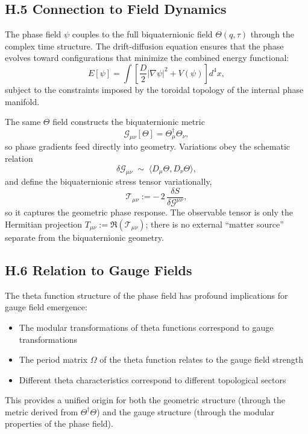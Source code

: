 \subsection*{H.5 Connection to Field Dynamics}

The phase field $\psi$ couples to the full biquaternionic field $\Theta(q,\tau)$ through the complex time structure. The drift-diffusion equation ensures that the phase evolves toward configurations that minimize the combined energy functional:
\begin{equation}
E[\psi] = \int \left[\frac{D}{2}|\nabla \psi|^2 + V(\psi)\right] d^4x,
\end{equation}
subject to the constraints imposed by the toroidal topology of the internal phase manifold.

The same $\Theta$ field constructs the biquaternionic metric
\[
\mathcal{G}_{\mu\nu}[\Theta]=\Theta_\mu^\dagger\Theta_\nu,
\]
so phase gradients feed directly into geometry. Variations obey the schematic relation
\[
\delta\mathcal{G}_{\mu\nu} \;\sim\; \langle D_\mu \Theta, D_\nu \Theta\rangle,
\]
and define the biquaternionic stress tensor variationally,
\[
\mathcal{T}_{\mu\nu}:=-\,2\,\frac{\delta S}{\delta \mathcal{G}^{\mu\nu}},
\]
so it captures the geometric phase response. The observable tensor is only the Hermitian projection $T_{\mu\nu}:=\Re(\mathcal{T}_{\mu\nu})$; there is no external ``matter source'' separate from the biquaternionic geometry.

\subsection*{H.6 Relation to Gauge Fields}

The theta function structure of the phase field has profound implications for gauge field emergence:

\begin{itemize}
\item The modular transformations of theta functions correspond to gauge transformations
\item The period matrix $\Omega$ of the theta function relates to the gauge field strength
\item Different theta characteristics correspond to different topological sectors
\end{itemize}

This provides a unified origin for both the geometric structure (through the metric derived from $\Theta^\dagger\Theta$) and the gauge structure (through the modular properties of the phase field).

